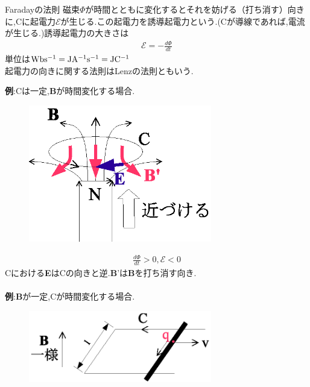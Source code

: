 \documentclass{jsarticle}
\begin{document}
\begin{itembox}[c]{Faradayの法則}
磁束$\Phi$が時間とともに変化するとそれを妨げる（打ち消す）向きに,Cに起電力$\mathcal{E}$が生じる.この起電力を誘導起電力という.(Cが導線であれば,電流が生じる.)誘導起電力の大きさは
\begin{eqnarray}
\mathcal{E}=-\frac{d \Phi}{dt}
\end{eqnarray}
単位は${\rm Wbs^{-1}=JA^{-1}s^{-1}=JC^{-1}}$ \\
起電力の向きに関する法則はLenzの法則ともいう.
\end{itembox}
{\bf 例}:Cは一定,{\bf B}が時間変化する場合. \\

\begin{figure}[htbp]
 \begin{center}
  \includegraphics[width=80mm]{11.1.eps}
 \end{center}
 \caption{}
 \label{fig:one}
\end{figure}

\begin{eqnarray*}
\frac{d \Phi}{dt} > 0,\mathcal{E}<0
\end{eqnarray*}
Cにおける{\bf E}はCの向きと逆.{\bf B}'は{\bf B}を打ち消す向き. \\
\\
{\bf 例}:{\bf B}が一定,Cが時間変化する場合. \\

\begin{figure}[htbp]
 \begin{center}
  \includegraphics[width=80mm]{11.2.eps}
 \end{center}
 \caption{}
 \label{fig:one}
\end{figure}
\end{document}
